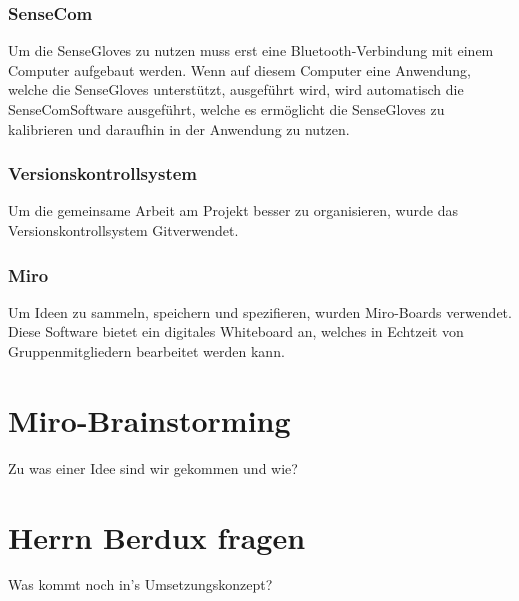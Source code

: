 \subsubsection{SenseCom}
Um die SenseGloves zu nutzen muss erst eine Bluetooth-Verbindung mit einem Computer aufgebaut werden. Wenn auf diesem Computer eine Anwendung, welche die SenseGloves unterstützt, ausgeführt wird, wird automatisch die \dq SenseCom\dq Software ausgeführt, welche es ermöglicht die SenseGloves zu kalibrieren und daraufhin in der Anwendung zu nutzen. 

\subsubsection{Versionskontrollsystem}
Um die gemeinsame Arbeit am Projekt besser zu organisieren, wurde das Versionskontrollsystem \dq Git\dq verwendet.

\subsubsection{Miro}
Um Ideen zu sammeln, speichern und spezifieren, wurden Miro-Boards verwendet. Diese Software bietet ein digitales Whiteboard an, welches in Echtzeit von Gruppenmitgliedern bearbeitet werden kann.


\section{Miro-Brainstorming}
Zu was einer Idee sind wir gekommen und wie?

\section{Herrn Berdux fragen}
Was kommt noch in's Umsetzungskonzept?